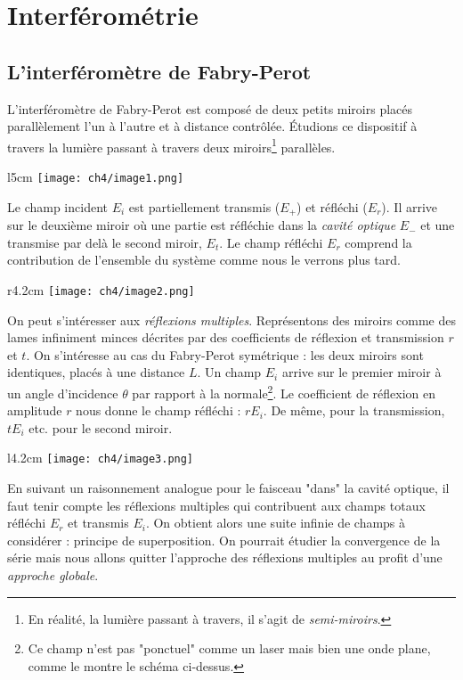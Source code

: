 \chapter{Interférométrie}

\section{L'interféromètre de Fabry-Perot}
L’interféromètre de Fabry-Perot est composé de deux petits miroirs placés parallèlement l'un à 
l'autre et à distance contrôlée. Étudions ce dispositif à travers la lumière passant à travers 
deux miroirs\footnote{En réalité, la lumière passant à travers, il s'agit de \textit{semi-miroirs}.} 
parallèles.\\

	\begin{wrapfigure}[6]{l}{5cm}
	\vspace{-5mm}
	\texttt{[image: ch4/image1.png]}
	\end{wrapfigure}
Le champ incident $E_i$ est partiellement transmis ($E_+$) et réfléchi ($E_r$). Il arrive sur 
le deuxième miroir où une partie est réfléchie dans la \textit{cavité optique} $E_-$ et une transmise 
par delà le second miroir, $E_t$. Le champ réfléchi $E_r$ comprend la contribution de l'ensemble 
du système comme nous le verrons plus tard. \\

	\begin{wrapfigure}[8]{r}{4.2cm}
	\vspace{-5mm}
	\texttt{[image: ch4/image2.png]}
	\end{wrapfigure}
On peut s'intéresser aux \textit{réflexions multiples}. Représentons des miroirs comme 
des lames infiniment minces décrites par des coefficients de réflexion et transmission $r$ et $t$. 
On s'intéresse au cas du Fabry-Perot symétrique : les deux miroirs sont identiques, placés à une 
distance $L$. Un champ $E_i$ arrive sur le premier miroir à un angle d’incidence $\theta$ par 
rapport à la normale\footnote{Ce champ n'est pas "ponctuel" comme un laser mais bien une onde 
plane, comme le montre le schéma ci-dessus.}. Le coefficient de réflexion en amplitude $r$ nous 
donne le champ réfléchi : $rE_i$. De même, pour la transmission, $tE_i$ etc. pour le second miroir.\\

	\begin{wrapfigure}[8]{l}{4.2cm}
	\vspace{-5mm}
	\texttt{[image: ch4/image3.png]}
	\end{wrapfigure}
En suivant un raisonnement analogue pour le faisceau "dans" la cavité optique, il faut tenir compte 
les réflexions multiples qui contribuent aux champs totaux réfléchi $E_r$ et transmis $E_i$. On obtient 
alors une suite infinie de champs à considérer : principe de superposition. On pourrait étudier la 
convergence de la série mais nous allons quitter l'approche des réflexions multiples au profit d'une 
\textit{approche globale}.\\

